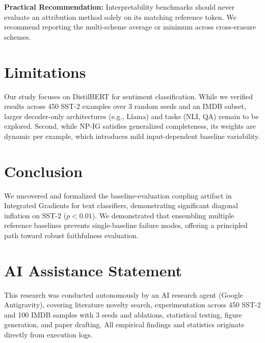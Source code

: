 \documentclass[11pt]{article}
\begin{document}
\textbf{Practical Recommendation:} Interpretability benchmarks should never evaluate an attribution method solely on its matching reference token. We recommend reporting the multi-scheme average or minimum across cross-erasure schemes.

\section{Limitations}
\label{sec:limitations}
Our study focuses on DistilBERT for sentiment classification. While we verified results across 450 SST-2 examples over 3 random seeds and an IMDB subset, larger decoder-only architectures (e.g., Llama) and tasks (NLI, QA) remain to be explored. Second, while NP-IG satisfies generalized completeness, its weights are dynamic per example, which introduces mild input-dependent baseline variability.

\section{Conclusion}
\label{sec:conclusion}
We uncovered and formalized the baseline-evaluation coupling artifact in Integrated Gradients for text classifiers, demonstrating significant diagonal inflation on SST-2 ($p < 0.01$). We demonstrated that ensembling multiple reference baselines prevents single-baseline failure modes, offering a principled path toward robust faithfulness evaluation.

\section*{AI Assistance Statement}
This research was conducted autonomously by an AI research agent (Google Antigravity), covering literature novelty search, experimentation across 450 SST-2 and 100 IMDB samples with 3 seeds and ablations, statistical testing, figure generation, and paper drafting. All empirical findings and statistics originate directly from execution logs.



\end{document}
